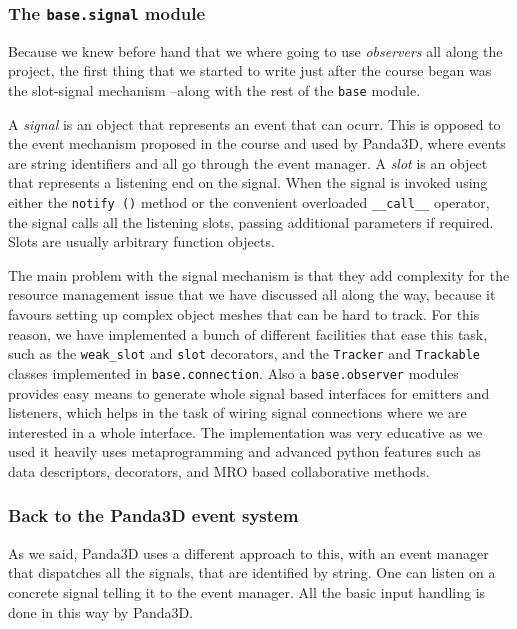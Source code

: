 \documentclass[a4paper,10pt]{article}
\begin{document}
\subsubsection{The \texttt{base.signal} module}

Because we knew before hand that we where going to use
\emph{observers} all along the project, the first thing that we
started to write just after the course began was the slot-signal
mechanism --along with the rest of the \texttt{base} module.

A \emph{signal} is an object that represents an event that can
ocurr. This is opposed to the event mechanism proposed in the course
and used by Panda3D, where events are string identifiers and all go
through the event manager. A \emph{slot} is an object that represents
a listening end on the signal. When the signal is invoked using either
the \texttt{notify ()} method or the convenient overloaded
\texttt{\_\_call\_\_} operator, the signal calls all the listening
slots, passing additional parameters if required. Slots are usually
arbitrary function objects.

The main problem with the signal mechanism is that they add complexity
for the resource management issue that we have discussed all along the
way, because it favours setting up complex object meshes that can be
hard to track. For this reason, we have implemented a bunch of
different facilities that ease this task, such as the
\texttt{weak\_slot} and \texttt{slot} decorators, and the
\texttt{Tracker} and \texttt{Trackable} classes implemented in
\texttt{base.connection}. Also a \texttt{base.observer} modules
provides easy means to generate whole signal based interfaces for
emitters and listeners, which helps in the task of wiring signal
connections where we are interested in a whole interface. The
implementation was very educative as we used it heavily uses
metaprogramming and advanced python features such as data descriptors,
decorators, and MRO based collaborative methods.

\subsubsection{Back to the Panda3D event system}

As we said, Panda3D uses a different approach to this, with an event
manager that dispatches all the signals, that are identified by
string. One can listen on a concrete signal telling it to the event
manager. All the basic input handling is done in this way by Panda3D.
\end{document}
